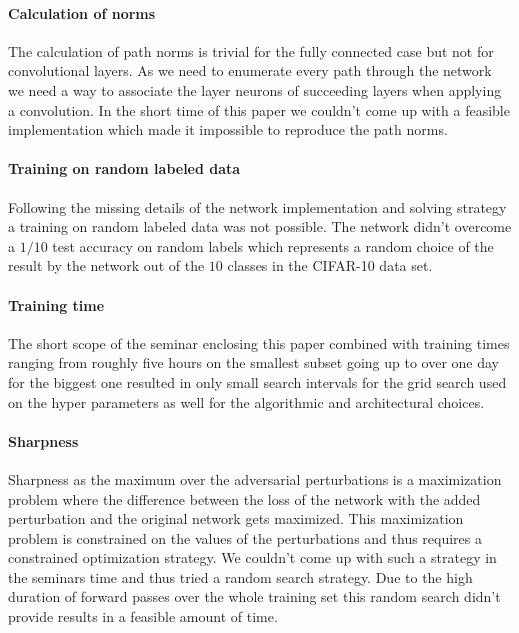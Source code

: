 \paragraph{Calculation of norms}
\label{sec:problems-calculation-norms}
The calculation of path norms \cite{DBLP:journals/corr/NeyshaburSS15} is trivial for the fully connected case but not for convolutional layers. As we need to enumerate every path through the network we need a way to associate the layer neurons of succeeding layers when applying a convolution. In the short time of this paper we couldn't come up with a feasible implementation which made it impossible to reproduce the path norms.
%
\paragraph{Training on random labeled data}
Following the missing details of the network implementation and solving strategy a training on random labeled data was not possible. The network didn't overcome a $1/10$ test accuracy on random labels which represents a random choice of the result by the network out of the $10$ classes in the CIFAR-10 data set.

\paragraph{Training time}
\label{sec:problems-training-time}
The short scope of the seminar enclosing this paper combined with training times ranging from roughly five hours on the smallest subset going up to over one day for the biggest one resulted in only small search intervals for the grid search used on the hyper parameters as well for the algorithmic and architectural choices.
%
\paragraph{Sharpness}
\label{sec:problems-sharpness}
Sharpness as the maximum over the adversarial perturbations is a maximization problem where the difference between the loss of the network with the added perturbation and the original network gets maximized. This maximization problem is constrained on the values of the perturbations and thus requires a constrained optimization strategy. We couldn't come up with such a strategy in the seminars time and thus tried a random search strategy. Due to the high duration of forward passes over the whole training set this random search didn't provide results in a feasible amount of time.
%
%
%
%
%
